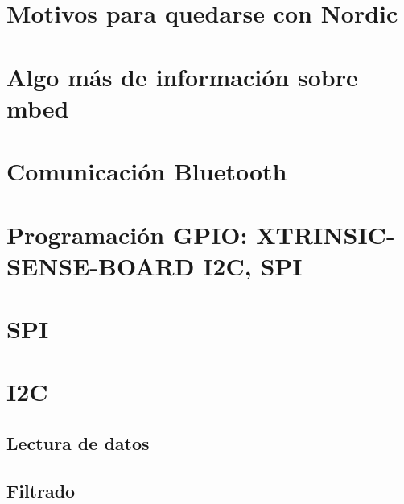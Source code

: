 \section{Motivos para quedarse con Nordic}
\label{makereference4.3}

\section{Algo más de información sobre mbed}
\label{makereference4.4}

\section{Comunicación Bluetooth}
\label{makereference4.5}

\section{Programación GPIO: XTRINSIC-SENSE-BOARD I2C, SPI}
\label{makereference4.6}

\section{SPI}
\label{makereference4.7}

\section{I2C}
\label{makereference4.8}

\subsection{Lectura de datos}
\label{makereference4.8.1}

\subsection{Filtrado}
\label{makereference4.8.2}